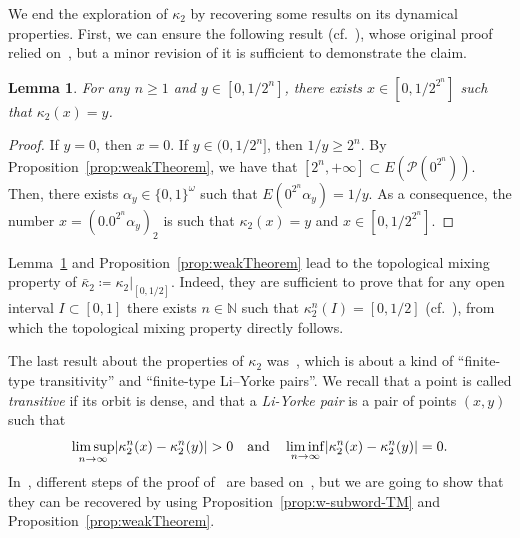 \documentclass[12pt]{article}
\DeclarePairedDelimiter{\abs}{|}{|}
\theoremstyle{plain}\newtheorem{teo}{Theorem}
\theoremstyle{plain}\newtheorem{proposition}[teo]{Proposition}
\theoremstyle{plain}\newtheorem{lemma}[teo]{Lemma}
\theoremstyle{plain}\newtheorem{corollary}[teo]{Corollary}
\theoremstyle{plain}\newtheorem{conjecture}[teo]{Conjecture}
\theoremstyle{definition}\newtheorem{definition}[teo]{Definition}
\theoremstyle{remark}\newtheorem{remark}[teo]{Remark}
\theoremstyle{definition}\newtheorem{example}[teo]{Example}
\numberwithin{teo}{section}
\numberwithin{equation}{section}
\begin{document}
We end the exploration of $\kappa_2$
by recovering some results on its dynamical properties.
First, we can ensure the following result
(cf.~\cite[Lemma 32]{Critical}),
whose original proof relied on~\cite[Theorem 7]{Critical},
but a minor revision of it is sufficient to 
demonstrate the claim.
\begin{lemma}
	\label{lem:near0}
	For any
	$n \ge 1$ and 
	$y \in [0,1/2^n]$,
	there exists $x \in [0,1/2^{2^n}]$
	such that $\kappa_2(x) = y$.
\end{lemma}
\begin{proof}
	If $y=0$,
	then $x=0$.
	If $y\in(0,1/2^n]$, then $1/y\ge 2^n$.
	By Proposition~\ref{prop:weakTheorem},
	we have that $[2^n,+\infty] \subset E(\mathcal{P}(0^{2^{n}}))$.
	Then, there exists $\alpha_y\in\{0,1\}^\omega$
	such that $E(0^{2^{n}}\alpha_y)=1/y$.
	As a consequence, the number $x=(0.0^{2^{n}}\alpha_y)_2$
	is such that $\kappa_2(x)=y$ and $x\in [0,1/2^{2^{n}}]$.
\end{proof}

Lemma~\ref{lem:near0}
and Proposition~\ref{prop:weakTheorem}
lead to the topological mixing property of 
$\bar\kappa_2 \coloneqq \kappa_2|_{[0,1/2]}$.
Indeed, they are sufficient to prove that 
for any open interval $I \subset [0,1]$
there exists $n\in\mathbb{N}$ such that 
$\kappa_2^n(I) = [0,1/2]$
(cf.~\cite[Proposition 33]{Critical}),
from which the topological mixing property
directly follows.

The last result about the properties of $\kappa_2$
was~\cite[Lemma 36]{Critical},
which is about a kind of ``finite-type transitivity''
and ``finite-type Li–Yorke pairs''.
We recall that a point is called \textit{transitive} if its orbit is dense,
and that a \textit{Li-Yorke pair} is a pair of points $(x,y)$ such that
\[
	\limsup_{n \to \infty}\abs{\kappa_2^{n}(x) - \kappa_2^n(y)} > 0
	\quad \text{and} \quad
	\liminf_{n \to \infty}\abs{\kappa_2^{n}(x) - \kappa_2^n(y)} = 0.
\]
In~\cite{Critical}, different steps of the proof of~\cite[Lemma 36]{Critical}
are based on~\cite[Theorem 7]{Critical},
but we are going to show that they can be 
recovered by using Proposition~\ref{prop:w-subword-TM}
and Proposition~\ref{prop:weakTheorem}.
\end{document}
